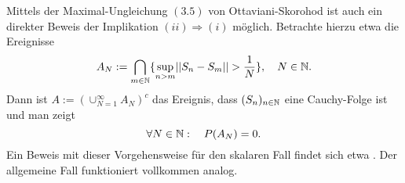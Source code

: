\begin{remark}
    Mittels der Maximal-Ungleichung $(3.5)$ von Ottaviani-Skorohod ist auch ein direkter Beweis der Implikation $(ii) \Rightarrow (i)$ möglich. Betrachte hierzu etwa die Ereignisse 
    $$
        A_N := \bigcap_{m \in \mathbb{N}}\{\sup_{n > m} \lvert\lvert S_n - S_m \rvert\rvert > \frac{1}{N}\}, \quad N \in \mathbb{N}.                                                                                                                        
    $$
    Dann ist $A := (\cup_{N=1}^{\infty} A_N)^c$ das Ereignis, dass $(S_n)_{n \in \mathbb{N}}$ eine Cauchy-Folge ist und man zeigt 
    $$
        \forall N \in \mathbb{N}: \quad P(A_N) = 0. 
    $$
    Ein Beweis mit dieser Vorgehensweise für den skalaren Fall findet sich etwa \cite[Theorem 14.2]{bauer}. Der allgemeine Fall funktioniert vollkommen analog. \qexampled
\end{remark}



